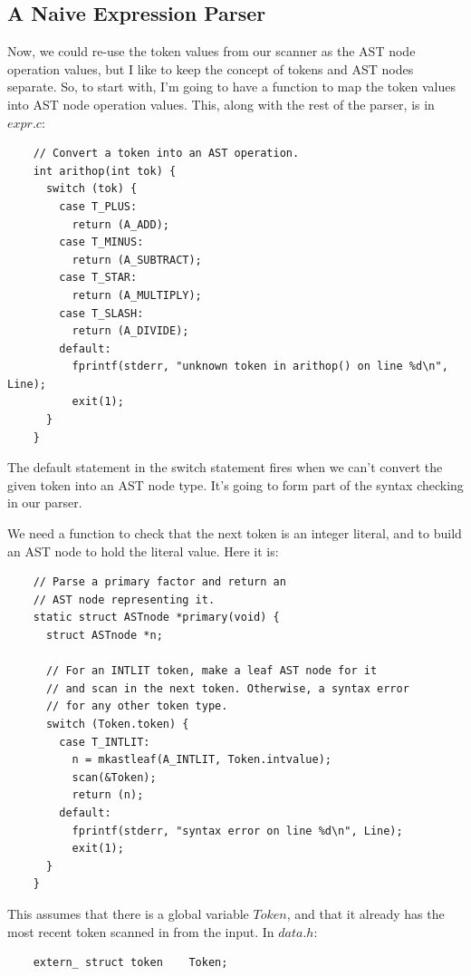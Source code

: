 \documentclass[a4paper,12pt]{article}
\begin{document}
\subsection{A Naive Expression Parser}

Now, we could re-use the token values from our scanner as the AST node operation values, but I like to keep the concept of tokens and AST nodes separate. So, to start with, I'm going to have a function to map the token values into AST node operation values. This, along with the rest of the parser, is in $expr.c$:

\begin{lstlisting}
    // Convert a token into an AST operation.
    int arithop(int tok) {
      switch (tok) {
        case T_PLUS:
          return (A_ADD);
        case T_MINUS:
          return (A_SUBTRACT);
        case T_STAR:
          return (A_MULTIPLY);
        case T_SLASH:
          return (A_DIVIDE);
        default:
          fprintf(stderr, "unknown token in arithop() on line %d\n", Line);
          exit(1);
      }
    }
\end{lstlisting}

The default statement in the switch statement fires when we can't convert the given token into an AST node type. It's going to form part of the syntax checking in our parser.

We need a function to check that the next token is an integer literal, and to build an AST node to hold the literal value. Here it is:

\begin{lstlisting}
    // Parse a primary factor and return an
    // AST node representing it.
    static struct ASTnode *primary(void) {
      struct ASTnode *n;

      // For an INTLIT token, make a leaf AST node for it
      // and scan in the next token. Otherwise, a syntax error
      // for any other token type.
      switch (Token.token) {
        case T_INTLIT:
          n = mkastleaf(A_INTLIT, Token.intvalue);
          scan(&Token);
          return (n);
        default:
          fprintf(stderr, "syntax error on line %d\n", Line);
          exit(1);
      }
    }
\end{lstlisting}

This assumes that there is a global variable $Token$, and that it already has the most recent token scanned in from the input. In $data.h$:

\begin{lstlisting}
    extern_ struct token    Token;
\end{lstlisting}
\end{document}
